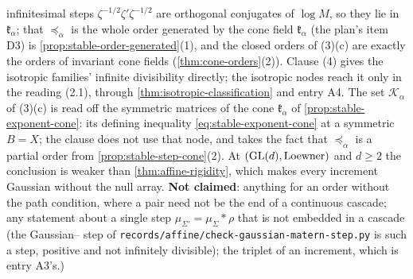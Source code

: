 \begin{theorem}
{infinitesimal steps $\zeta^{-1/2}\zeta'\zeta^{-1/2}$ are orthogonal conjugates of $\log M$, so they lie
in $\mathfrak k_\alpha$; that $\preceq_\alpha$ is the whole order generated by the cone field $\mathfrak k_\alpha$ (the
plan's item D3) is \ref{prop:stable-order-generated}(1), and the closed orders of (3)(c) are exactly the
orders of invariant cone fields (\ref{thm:cone-orders}(2)). Clause (4) gives the isotropic families' infinite divisibility directly;
the isotropic nodes reach it only in the reading (2.1), through \ref{thm:isotropic-classification}
and entry A4. The set $\mathcal K_\alpha$ of (3)(c) is read off the symmetric matrices of the cone
$\mathfrak k_\alpha$ of \ref{prop:stable-exponent-cone}: its defining inequality \ref{eq:stable-exponent-cone}
at a symmetric $B = X$; the clause does not use that node, and takes the fact that
$\preceq_\alpha$ is a partial order from \ref{prop:stable-step-cone}(2). At $(\mathrm{GL}(d), \text{Loewner})$ and
$d \ge 2$ the conclusion is weaker than \ref{thm:affine-rigidity}, which makes every increment
Gaussian without the null array. \textbf{Not claimed}:
anything for an order without the path condition, where a pair need not be the end of a continuous
cascade; any statement about a single step $\mu_{\Sigma'} = \mu_\Sigma * \rho$ that is not embedded in
a cascade (the Gaussian--\Matern{} step of \texttt{records/affine/check-gaussian-matern-step.py} is
such a step, positive and not infinitely divisible); the triplet of an increment, which is entry
A3's.)}
\end{theorem}

